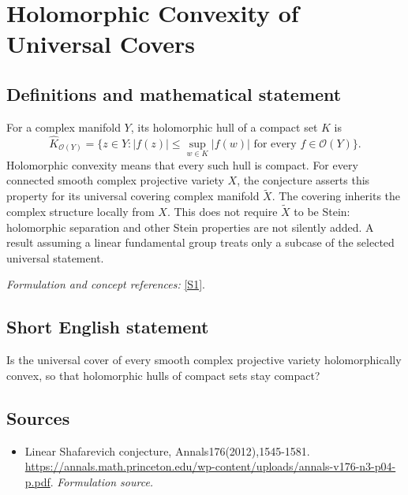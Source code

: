 \documentclass[11pt]{article}
\begin{document}
\section*{\texorpdfstring{Holomorphic Convexity of Universal Covers}{Holomorphic Convexity of Universal Covers}}\label{30006077}
\subsection{Definitions and mathematical statement}
For a complex manifold $Y$, its holomorphic hull of a compact set $K$ is
\[
 \widehat K_{\mathcal O(Y)}=
 \{z\in Y:|f(z)|\le\sup_{w\in K}|f(w)|\text{ for every }f\in\mathcal O(Y)\}.
\]
Holomorphic convexity means that every such hull is compact. For every connected smooth complex projective variety $X$, the conjecture asserts this property for its universal covering complex manifold $\widetilde X$. The covering inherits the complex structure locally from $X$. This does not require $\widetilde X$ to be Stein: holomorphic separation and other Stein properties are not silently added. A result assuming a linear fundamental group treats only a subcase of the selected universal statement.
\par\smallskip\textit{Formulation and concept references:} \href{https://annals.math.princeton.edu/wp-content/uploads/annals-v176-n3-p04-p.pdf}{[S1]}.

\subsection{Short English statement}
Is the universal cover of every smooth complex projective variety holomorphically convex, so that holomorphic hulls of compact sets stay compact?
\subsection{Sources}
\begin{itemize}
\item[S1]Linear Shafarevich conjecture, Annals176(2012),1545-1581.
\url{https://annals.math.princeton.edu/wp-content/uploads/annals-v176-n3-p04-p.pdf}.
\textit{Formulation source.}
\end{itemize}
\end{document}
